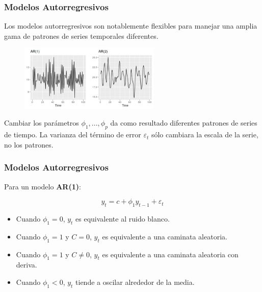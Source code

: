 \documentclass[10pt]{beamer}
\begin{document}
\begin{frame}[fragile]
\frametitle{Modelos Autorregresivos}


Los modelos autorregresivos son notablemente flexibles para manejar una amplia gama de patrones de series temporales diferentes.

\vspace{4mm}


\begin{figure}
\begin{center}
    \includegraphics[width=0.6\textwidth]{Imagen9.JPG}
\end{center}
\end{figure}


Cambiar los parámetros $\phi_1, ..., \phi_p$ da como resultado diferentes patrones de series de tiempo. La varianza del término de error $\varepsilon_t$ sólo cambiara la escala de la serie, no los patrones.

\end{frame}







\begin{frame}[fragile]
\frametitle{Modelos Autorregresivos}


Para un modelo \textbf{AR(1)}:
\vspace{4mm}


\begin{block}{}
\begin{equation}
y_{t}  =  c  +  \phi_{1}y_{t - 1} + \varepsilon_{t}
\end{equation}
\end{block}


\begin{itemize}
\item Cuando $\phi_1 = 0$, $y_t$ es equivalente al ruido blanco.
\item Cuando $\phi_1 = 1$ y $C = 0$, $y_t$ es equivalente a una caminata aleatoria.
\item Cuando $\phi_1 = 1$ y $C \neq 0$, $y_t$ es equivalente a una caminata aleatoria con deriva.
\item Cuando $\phi_1 < 0$, $y_t$ tiende a oscilar alrededor de la media.
\end{itemize}

\end{frame}
\end{document}
